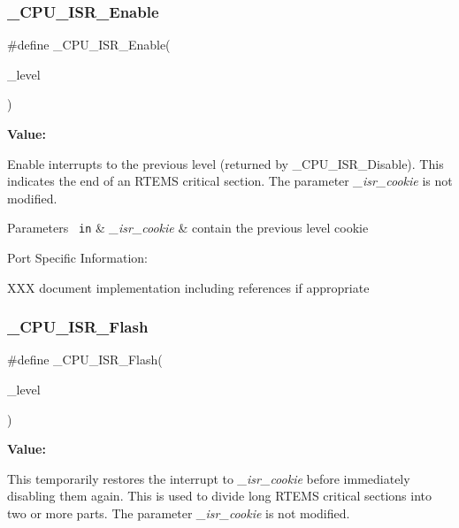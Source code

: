 \subsubsection{\texorpdfstring{\_CPU\_ISR\_Enable}{\_CPU\_ISR\_Enable}}
{\footnotesize\ttfamily \#define \+\_\+\+C\+P\+U\+\_\+\+I\+S\+R\+\_\+\+Enable(\begin{DoxyParamCaption}\item[{}]{\+\_\+level }\end{DoxyParamCaption})}

{\bfseries Value\+:}
\begin{DoxyCode}{0}
\DoxyCodeLine{\{ \(\backslash\)}
\DoxyCodeLine{  \}}

\end{DoxyCode}
Enable interrupts to the previous level (returned by \+\_\+\+C\+P\+U\+\_\+\+I\+S\+R\+\_\+\+Disable). This indicates the end of an R\+T\+E\+MS critical section. The parameter {\itshape \+\_\+isr\+\_\+cookie} is not modified.


\begin{DoxyParams}[1]{Parameters}
\mbox{\texttt{ in}}  & {\em \+\_\+isr\+\_\+cookie} & contain the previous level cookie\\
\hline
\end{DoxyParams}
Port Specific Information\+:

X\+XX document implementation including references if appropriate \mbox{\label{group__RTEMSScoreCPUBfinCPUInterrupt_gab06bc7d1751ca97bbe1f4c50d14c4453}} 
\subsubsection{\texorpdfstring{\_CPU\_ISR\_Flash}{\_CPU\_ISR\_Flash}}
{\footnotesize\ttfamily \#define \+\_\+\+C\+P\+U\+\_\+\+I\+S\+R\+\_\+\+Flash(\begin{DoxyParamCaption}\item[{}]{\+\_\+level }\end{DoxyParamCaption})}

{\bfseries Value\+:}
\begin{DoxyCode}{0}
\DoxyCodeLine{\{ \(\backslash\)}
\DoxyCodeLine{  \}}

\end{DoxyCode}
This temporarily restores the interrupt to {\itshape \+\_\+isr\+\_\+cookie} before immediately disabling them again. This is used to divide long R\+T\+E\+MS critical sections into two or more parts. The parameter {\itshape \+\_\+isr\+\_\+cookie} is not modified.


